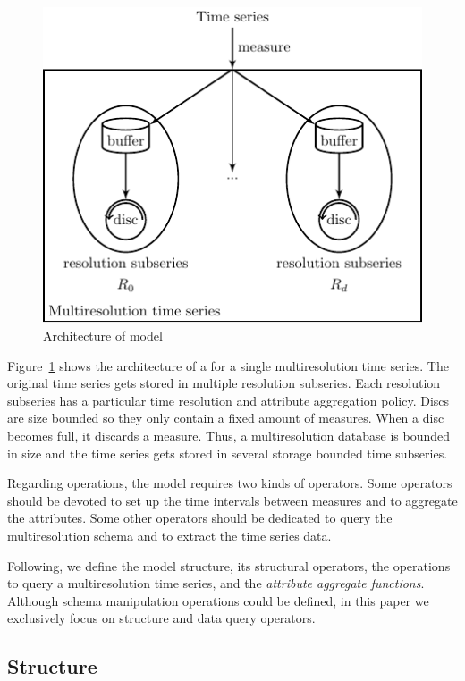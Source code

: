 \begin{figure}
  \centering
  \includegraphics{fig_model_mtsdb.pdf}
  \caption{Architecture of  model}
  \label{fig:model:mtsdb}
\end{figure}

Figure~\ref{fig:model:mtsdb} shows the architecture of a 
for a single multiresolution time series. The original time series
gets stored in multiple resolution subseries. Each resolution
subseries has a particular time resolution and attribute aggregation
policy. Discs are size bounded so they only contain a fixed amount
of measures. When a disc becomes full, it discards a measure. Thus, a
multiresolution database is bounded in size and the time series gets
stored in several storage bounded time subseries.

Regarding operations, the  model requires two kinds of
operators. Some operators should be devoted to set up the time
intervals between measures and to aggregate the attributes. Some other
operators should be dedicated to query the multiresolution schema and
to extract the time series data.

Following, we define the  model structure, its structural
operators, the operations to query a multiresolution time series, and
the \emph{attribute aggregate functions}.  Although schema
manipulation operations could be defined, in this paper we exclusively
focus on structure and data query operators.


\subsection{Structure}

